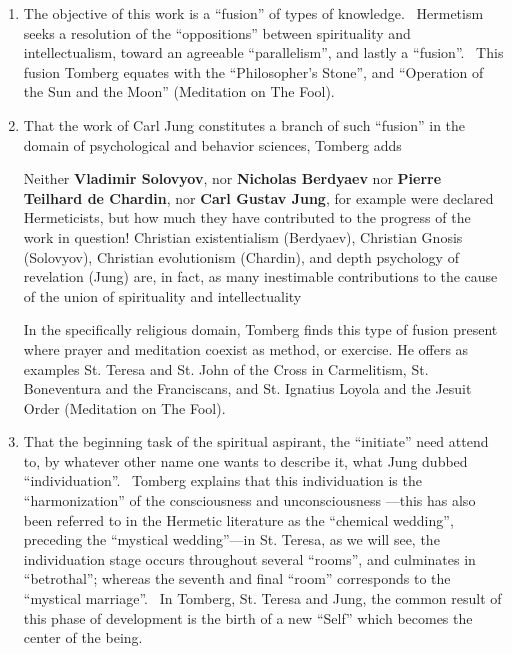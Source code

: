 \begin{enumerate}


\item The objective of this work is a ``fusion'' of types of knowledge.~ Hermetism seeks a resolution of the ``oppositions'' between spirituality and intellectualism, toward an agreeable ``parallelism'', and lastly a ``fusion''.~ This fusion Tomberg equates with the ``Philosopher's Stone'', and ``Operation of the Sun and the Moon'' (Meditation on The Fool).

\item That the work of Carl Jung constitutes a branch of such ``fusion'' in the domain of psychological and behavior sciences, Tomberg adds

\begin{quotex}
Neither \textbf{Vladimir Solovyov}, nor \textbf{Nicholas Berdyaev} nor \textbf{Pierre Teilhard de Chardin}, nor \textbf{Carl Gustav Jung}, for example were declared Hermeticists, but how much they have contributed to the progress of the work in question! Christian existentialism (Berdyaev), Christian Gnosis (Solovyov), Christian evolutionism (Chardin), and depth psychology of revelation (Jung) are, in fact, as many inestimable contributions to the cause of the union of spirituality and intellectuality 
\end{quotex}


In the specifically religious domain, Tomberg finds this type of fusion present where prayer and meditation coexist as method, or exercise. He offers as examples St. Teresa and St. John of the Cross in Carmelitism, St. Boneventura and the Franciscans, and St. Ignatius Loyola and the Jesuit Order (Meditation on The Fool).

\item That the beginning task of the spiritual aspirant, the ``initiate'' need attend to, by whatever other name one wants to describe it, what Jung dubbed ``individuation''.~ Tomberg explains that this individuation is the ``harmonization'' of the consciousness and unconsciousness ---this has also been referred to in the Hermetic literature as the ``chemical wedding'', preceding the ``mystical wedding''---in St. Teresa, as we will see, the individuation stage occurs throughout several ``rooms'', and culminates in ``betrothal''; whereas the seventh and final ``room'' corresponds to the ``mystical marriage''.~ In Tomberg, St. Teresa and Jung, the common result of this phase of development is the birth of a new ``Self'' which becomes the center of the being.
\end{enumerate}


